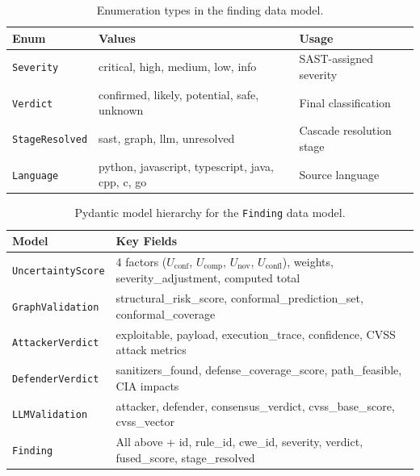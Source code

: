 \begin{table}[H]
\centering
{\small
\caption{Enumeration types in the finding data model.}
\label{tab:schema-enums}
\begin{tabular}{llp{7cm}}
\toprule
\textbf{Enum} & \textbf{Values} & \textbf{Usage} \\
\midrule
\texttt{Severity}      & critical, high, medium, low, info & SAST-assigned severity \\
\texttt{Verdict}       & confirmed, likely, potential, safe, unknown & Final classification \\
\texttt{StageResolved} & sast, graph, llm, unresolved & Cascade resolution stage \\
\texttt{Language}       & python, javascript, typescript, java, cpp, c, go & Source language \\
\bottomrule
\end{tabular}
}
\end{table}

\begin{table}[H]
\centering
{\small
\caption{Pydantic model hierarchy for the \texttt{Finding} data model.}
\label{tab:schema-models}
\begin{tabular}{lp{9cm}}
\toprule
\textbf{Model} & \textbf{Key Fields} \\
\midrule
\texttt{UncertaintyScore}  & 4 factors ($U_{\text{conf}}$, $U_{\text{comp}}$, $U_{\text{nov}}$, $U_{\text{confl}}$), weights, severity\_adjustment, computed total \\
\texttt{GraphValidation}   & structural\_risk\_score, conformal\_prediction\_set, conformal\_coverage \\
\texttt{AttackerVerdict}   & exploitable, payload, execution\_trace, confidence, CVSS attack metrics \\
\texttt{DefenderVerdict}   & sanitizers\_found, defense\_coverage\_score, path\_feasible, CIA impacts \\
\texttt{LLMValidation}     & attacker, defender, consensus\_verdict, cvss\_base\_score, cvss\_vector \\
\texttt{Finding}           & All above + id, rule\_id, cwe\_id, severity, verdict, fused\_score, stage\_resolved \\
\bottomrule
\end{tabular}
}
\end{table}
